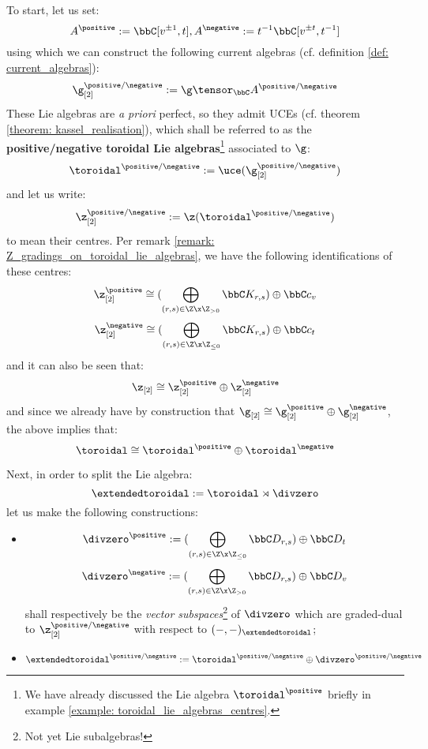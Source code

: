         To start, let us set:
            $$A^{\positive} := \bbC[v^{\pm 1}, t], A^{\negative} := t^{-1} \bbC[v^{\pm t}, t^{-1}]$$
        using which we can construct the following current algebras (cf. definition \ref{def: current_algebras}):
            $$\g_{[2]}^{\positive/\negative} := \g \tensor_{\bbC} A^{\positive/\negative}$$
        These Lie algebras are \textit{a priori} perfect, so they admit UCEs (cf. theorem \ref{theorem: kassel_realisation}), which shall be referred to as the \textbf{positive/negative toroidal Lie algebras}\footnote{We have already discussed the Lie algebra $\toroidal^{\positive}$ briefly in example \ref{example: toroidal_lie_algebras_centres}.} associated to $\g$:
            $$\toroidal^{\positive/\negative} := \uce(\g_{[2]}^{\positive/\negative})$$
        and let us write:
            $$\z_{[2]}^{\positive/\negative} := \z(\toroidal^{\positive/\negative})$$
        to mean their centres. Per remark \ref{remark: Z_gradings_on_toroidal_lie_algebras}, we have the following identifications of these centres:
            $$\z_{[2]}^{\positive} \cong ( \bigoplus_{(r, s) \in \Z \x \Z_{> 0} } \bbC K_{r, s} ) \oplus \bbC c_v$$
            $$\z_{[2]}^{\negative} \cong ( \bigoplus_{(r, s) \in \Z \x \Z_{\leq 0}} \bbC K_{r, s}) \oplus \bbC c_t$$
        and it can also be seen that:
            $$\z_{[2]} \cong \z_{[2]}^{\positive} \oplus \z_{[2]}^{\negative}$$
        and since we already have by construction that $\g_{[2]} \cong \g_{[2]}^{\positive} \oplus \g_{[2]}^{\negative}$, the above implies that:
            $$\toroidal \cong \toroidal^{\positive} \oplus \toroidal^{\negative}$$
        
        Next, in order to split the Lie algebra:
            $$\extendedtoroidal := \toroidal \rtimes \divzero$$
        let us make the following constructions:
        \begin{itemize}
            \item
                $$\divzero^{\positive} := ( \bigoplus_{(r, s) \in \Z \x \Z_{\leq 0} } \bbC D_{r, s} ) \oplus \bbC D_t$$
                $$\divzero^{\negative} := ( \bigoplus_{(r, s) \in \Z \x \Z_{> 0} } \bbC D_{r, s} ) \oplus \bbC D_v$$
            shall respectively be the \textit{vector subspaces}\footnote{Not yet Lie subalgebras!} of $\divzero$ which are graded-dual to $\z_{[2]}^{\positive/\negative}$ with respect to $(-, -)_{\extendedtoroidal}$;
            \item
                $$\extendedtoroidal^{\positive/\negative} := \toroidal^{\positive/\negative} \oplus \divzero^{\positive/\negative}$$
        \end{itemize}

